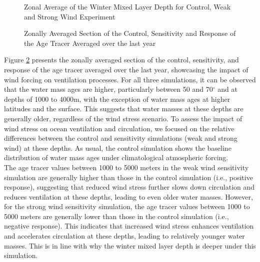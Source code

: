 \documentclass[12pt]{article}
\begin{document}
\begin{figure}
    \begin{center}
    \caption{Zonal Average of the Winter Mixed Layer Depth for Control, Weak and Strong Wind Experiment}
    \label{fig:R4}
    \end{center}
\end{figure}


\begin{figure}
    \begin{center}
    \caption{Zonally Averaged Section of the Control, Sensitivity and Response of the Age Tracer Averaged over the last year}
    \label{fig:R5}
    \end{center}
\end{figure}



\noindent Figure \ref{fig:R5} presents the zonally averaged section of the control, sensitivity, and response of the age tracer averaged over the last year, showcasing the impact of wind forcing on ventilation processes. For all three simulations, it can be observed that the water mass ages are higher, particularly between 50 and 70$^{\circ}$ and at depths of 1000 to 4000m, with the exception of water mass ages at higher latitudes and the surface. This suggests that water masses at these depths are generally older, regardless of the wind stress scenario. To assess the impact of wind stress on ocean ventilation and circulation, we focused on the relative differences between the control and sensitivity simulations (weak and strong wind) at these depths. As usual, the control simulation shows the baseline distribution of water mass ages under climatological atmospheric forcing.\\

\noindent The age tracer values between 1000 to 5000 meters in the weak wind sensitivity simulation are generally higher than those in the control simulation (i.e., positive response), suggesting that reduced wind stress further slows down circulation and reduces ventilation at these depths, leading to even older water masses. However, for the strong wind sensitivity simulation, the age tracer values between 1000 to 5000 meters are generally lower than those in the control simulation (i.e., negative response). This indicates that increased wind stress enhances ventilation and accelerates circulation at these depths, leading to relatively younger water masses. This is in line with why the winter mixed layer depth is deeper under this simulation.\\
\end{document}
